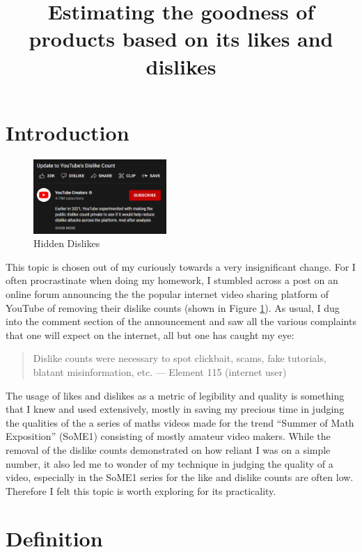 \documentclass[a4paper,11pt]{article}
\title{Estimating the goodness of products based on its likes and dislikes}
\author{}
\date{\vspace{-8ex}}
\begin{document}




\maketitle

\section{Introduction}

\begin{figure}
    \centering
    \includegraphics[width=0.45\textwidth]{assets/intro.png}
    \caption{Hidden Dislikes}
    \label{fig:hidden}
\end{figure}

This topic is chosen out of my curiously towards a very insignificant change. For I often procrastinate when doing my homework, I stumbled across a post on an online forum announcing the the popular internet video sharing platform of YouTube of removing their dislike counts (shown in Figure \ref{fig:hidden}). As usual, I dug into the comment section of the announcement and saw all the various complaints that one will expect on the internet, all but one has caught my eye:

\begin{quote}
    Dislike counts were necessary to spot clickbait, scams, fake tutorials, blatant misinformation, etc. --- Element 115 (internet user)
\end{quote}

The usage of likes and dislikes as a metric of legibility and quality is something that I knew and used extensively, mostly in saving my precious time in judging the qualities of the a series of maths videos made for the trend ``Summer of Math Exposition'' (SoME1) consisting of mostly amateur video makers. While the removal of the dislike counts demonstrated on how reliant I was on a simple number, it also led me to wonder of my technique in judging the quality of a video, especially in the SoME1 series for the like and dislike counts are often low. Therefore I felt this topic is worth exploring for its practicality.




\section{Definition}
\end{document}
